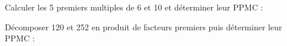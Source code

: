 \begin{methode*1}
 \exercice
Calculer les 5 premiers multiples de 6 et 10 et déterminer leur PPMC :
 
\dotfill

\dotfill

\dotfill

 \exercice
Décomposer 120 et 252 en produit de facteurs premiers puis déterminer leur PPMC :
 
\dotfill

\dotfill

\dotfill

 \end{methode*1}
 
